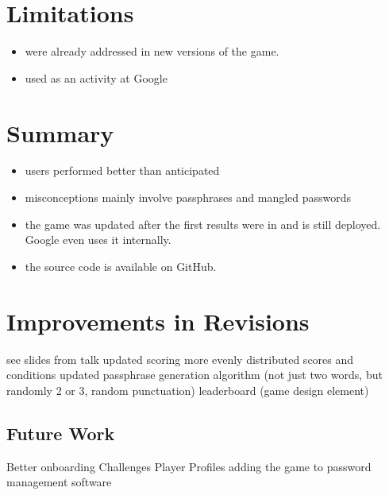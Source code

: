 \section{Limitations}
\begin{itemize}
	\item were already addressed in new versions of the game. 
	\item used as an activity at Google	
\end{itemize}


\section{Summary}
\begin{itemize}
	\item users performed better than anticipated
	\item misconceptions mainly involve passphrases and mangled passwords
	\item the game was updated after the first results were in and is still deployed. Google even uses it internally. 
	\item the source code is available on GitHub.
\end{itemize}

\section{Improvements in Revisions}
see slides from talk
updated scoring
more evenly distributed scores and conditions
updated passphrase generation algorithm (not just two words, but randomly 2 or 3, random punctuation)
leaderboard (game design element)

\subsection{Future Work}
Better onboarding
Challenges
Player Profiles 
adding the game to password management software

